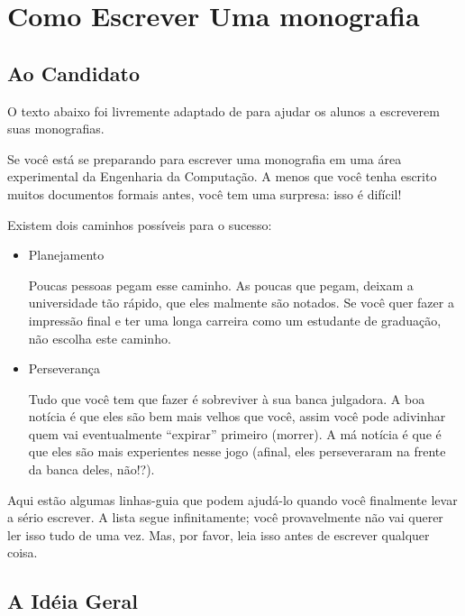 \chapter {Como Escrever Uma monografia}\label{cap:comoEscrever}

\section{Ao Candidato}

O texto abaixo foi livremente adaptado de \cite{COMER2010} para ajudar os alunos a escreverem suas monografias. 

Se você está se preparando para escrever uma monografia em uma área experimental da Engenharia da Computação. 
A menos que você tenha escrito muitos documentos formais antes, você tem uma surpresa: isso é difícil!

Existem dois caminhos possíveis para o sucesso:

\begin{itemize}
	\item Planejamento
	
	Poucas pessoas pegam esse caminho. As poucas que pegam, deixam a universidade tão rápido, 
	que eles malmente são notados. Se você quer fazer a impressão final e ter uma longa carreira como um 
	estudante de graduação, não escolha este caminho.
	
	\item Perseverança
	
	Tudo que você tem que fazer é sobreviver à sua banca julgadora. 
	A boa notícia é que eles são bem mais velhos que você, assim você pode adivinhar quem vai eventualmente 
	``expirar''  primeiro (morrer).
	A má notícia é que é que eles são mais experientes nesse jogo (afinal, eles perseveraram na frente da banca deles, não!?).
	
\end{itemize}
	
Aqui estão algumas linhas-guia que podem ajudá-lo quando você finalmente levar a sério escrever. 
A lista segue infinitamente; você provavelmente não vai querer ler isso tudo de uma vez. Mas, por favor, leia isso antes de 
escrever qualquer coisa.

\hfill

\section{A Idéia Geral}	


